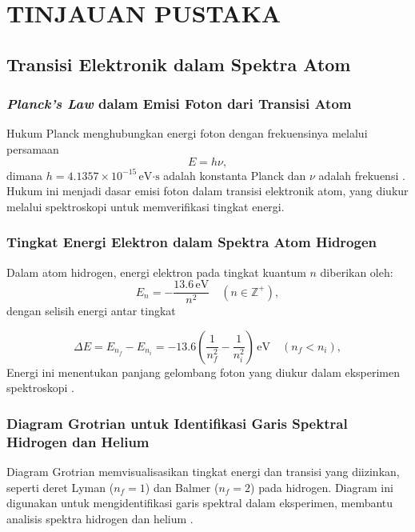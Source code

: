 
\chapter{TINJAUAN PUSTAKA}

\section{Transisi Elektronik dalam Spektra Atom}
\subsection{\textit{Planck's Law} dalam Emisi Foton dari Transisi Atom}
Hukum Planck menghubungkan energi foton dengan frekuensinya melalui persamaan 
\begin{equation}
    E = h\nu ,\label{planck}
\end{equation}
dimana $h = 4.1357 \times 10^{-15} \, \text{eV·s}$ adalah konstanta Planck dan $\nu$ adalah frekuensi \citep{Beiser1992}. Hukum ini menjadi dasar emisi foton dalam transisi elektronik atom, yang diukur melalui spektroskopi untuk memverifikasi tingkat energi.

\subsection{Tingkat Energi Elektron dalam Spektra Atom Hidrogen}
Dalam atom hidrogen, energi elektron pada tingkat kuantum $n$ diberikan oleh:
\begin{equation}
E_n = -\frac{13.6 \, \text{eV}}{n^2} \quad (n \in \mathbb{Z}^+), \label{energy_hydrogen}
\end{equation}
dengan selisih energi antar tingkat 

\begin{equation}
\Delta E = E_{n_f} - E_{n_i} = -13.6 \left( \frac{1}{n_f^2} - \frac{1}{n_i^2} \right) \, \text{eV} \quad (n_f < n_i), \label{deltaE}
\end{equation} 
Energi ini menentukan panjang gelombang foton yang diukur dalam eksperimen spektroskopi \citep{Griffiths2005}.

\subsection{Diagram Grotrian untuk Identifikasi Garis Spektral Hidrogen dan Helium}
Diagram Grotrian memvisualisasikan tingkat energi dan transisi yang diizinkan, seperti deret Lyman ($n_f = 1$) dan Balmer ($n_f = 2$) pada hidrogen. Diagram ini digunakan untuk mengidentifikasi garis spektral dalam eksperimen, membantu analisis spektra hidrogen dan helium \citep{Mason2015}.

